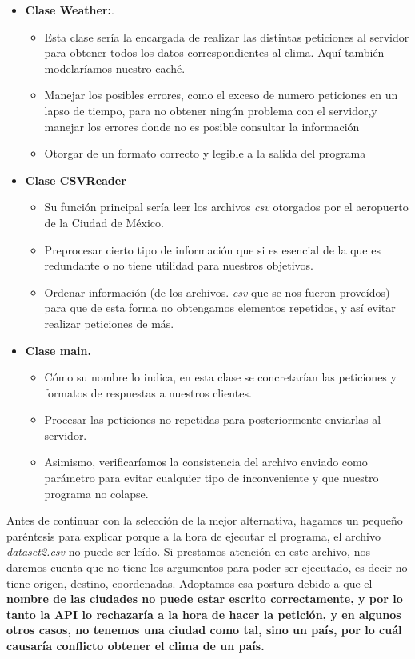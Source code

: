 \documentclass[letterpaper]{article}
\begin{document}
\begin{itemize}
	\item \textbf{Clase Weather:}.
	\begin{itemize}
		\item Esta clase sería la encargada de realizar las distintas peticiones al servidor para obtener todos los datos correspondientes al clima. Aquí también modelaríamos nuestro caché.
		\item Manejar los posibles errores, como el exceso de numero peticiones en un lapso de tiempo, para no obtener ningún problema con el servidor,y manejar los errores donde no es posible consultar la información
		\item Otorgar de un formato correcto y legible a la salida del programa
	\end{itemize}
	\item \textbf{Clase CSVReader}
	\begin{itemize}
		\item Su función principal sería leer los archivos \textit{csv} otorgados por el aeropuerto de la Ciudad de México.  
		\item Preprocesar cierto tipo de información que si es esencial de la que es redundante o no tiene utilidad para nuestros objetivos.
		\item Ordenar información (de los archivos. \textit{csv} que se nos fueron proveídos) para que de esta forma no obtengamos elementos repetidos, y así evitar realizar peticiones de más.
	\end{itemize}
	\item \textbf{Clase main.}
	\begin{itemize}
		\item Cómo su nombre lo indica, en esta clase se concretarían las peticiones y formatos de respuestas a nuestros clientes.
		\item Procesar las peticiones no repetidas para posteriormente enviarlas al servidor.
		\item Asimismo, verificaríamos la consistencia del archivo enviado como parámetro para evitar cualquier tipo de inconveniente y que nuestro programa no colapse.
	\end{itemize}
\end{itemize}
Antes de continuar con la selección de la mejor alternativa, hagamos un pequeño paréntesis para explicar porque a la hora de ejecutar el programa, el archivo \textit{dataset2.csv} no puede ser leído. Si prestamos atención en este archivo, nos daremos cuenta que no tiene los argumentos para poder ser ejecutado, es decir no tiene origen, destino, coordenadas. Adoptamos esa postura debido a que el \textbf{nombre de las ciudades no puede estar escrito correctamente, y por lo tanto la API lo rechazaría a la hora de hacer la petición, y en algunos otros casos, no tenemos una ciudad como tal, sino un país, por lo cuál causaría conflicto obtener el clima de un país. } \\
\end{document}
